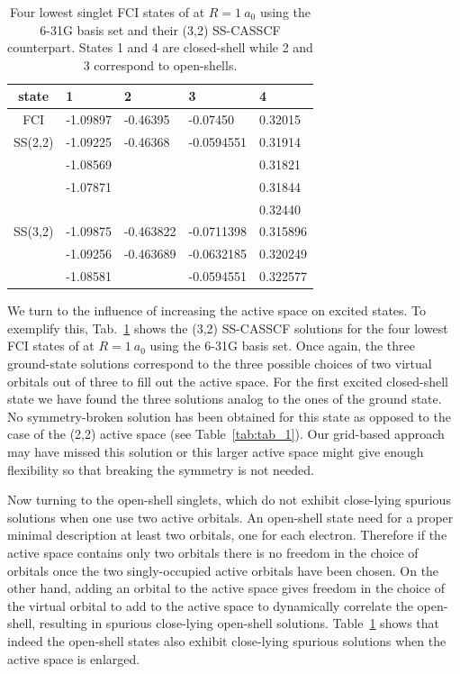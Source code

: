\documentclass[aip,jcp,reprint,noshowkeys,superscriptaddress]{revtex4-1}
\begin{document}
\begin{table}
  \caption{Four lowest singlet FCI states of  at $R=1~a_0$ using the 6-31G basis set and their (3,2) SS-CASSCF counterpart. States 1 and 4 are closed-shell while 2 and 3 correspond to open-shells.}
  \begin{ruledtabular}
    \label{tab:tab_3}
    \begin{tabular}{cllll}
      state & 1  & 2 & 3 & 4 \\
      \hline
      FCI & -1.09897 & -0.46395 & -0.07450 & 0.32015 \\
      \hline
      SS(2,2) & -1.09225 & -0.46368 & -0.0594551 & 0.31914 \\
            & -1.08569 &  &  & 0.31821 \\
            & -1.07871 &  &  & 0.31844 \\
            &  &  &  & 0.32440 \\
      \hline
      SS(3,2) & -1.09875 & -0.463822 & -0.0711398 & 0.315896 \\
            & -1.09256 & -0.463689 & -0.0632185 & 0.320249 \\
            & -1.08581 &  & -0.0594551 & 0.322577 \\
    \end{tabular}
  \end{ruledtabular}
\end{table}

We turn to the influence of increasing the active space on excited states.
To exemplify this, Tab.~\ref{tab:tab_3} shows the (3,2) SS-CASSCF solutions for the four lowest FCI states of  at $R=1~a_0$ using the 6-31G basis set.
Once again, the three ground-state solutions correspond to the three possible choices of two virtual orbitals out of three to fill out the active space.
For the first excited closed-shell state we have found the three solutions analog to the ones of the ground state.
No symmetry-broken solution has been obtained for this state as opposed to the case of the (2,2) active space (see Table~\ref{tab:tab_1}).
Our grid-based approach may have missed this solution or this larger active space might give enough flexibility so that breaking the symmetry is not needed.

Now turning to the open-shell singlets, which do not exhibit close-lying spurious solutions when one use two active orbitals.
An open-shell state need for a proper minimal description at least two orbitals, one for each electron.
Therefore if the active space contains only two orbitals there is no freedom in the choice of orbitals once the two singly-occupied active orbitals have been chosen.
On the other hand, adding an orbital to the active space gives freedom in the choice of the virtual orbital to add to the active space to dynamically correlate the open-shell, resulting in spurious close-lying open-shell solutions.
Table~\ref{tab:tab_3} shows that indeed the open-shell states also exhibit close-lying spurious solutions when the active space is enlarged.
\end{document}
